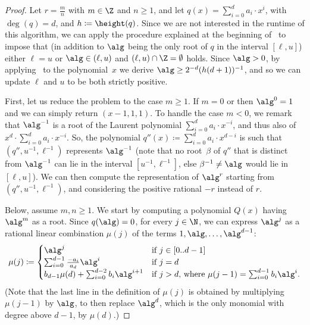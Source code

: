 \begin{proof}
  Let $r = \frac{m}{n}$ with $m \in \Z$ and $n \geq 1$, and let $q(x) =
  \sum_{i=0}^d a_i \cdot x^i$, with $\deg(q) = d$, and $h \coloneqq \height(q)$.
  Since we are not interested in the runtime of this algorithm, we can apply the
  procedure explained at the beginning of~ to
  impose that (in addition to $\alg$ being the only root of $q$ in the interval
  $[\ell,u]$) either $\ell = u$ or $\alg \in (\ell,u)$ and $(\ell,u) \cap \Z =
  \emptyset$ holds. Since $\alg > 0$, by
  applying~ to the polynomial~$x$ we derive $\alg
  \geq 2^{-d}(h(d+1))^{-1}$, and so we can update $\ell$ and $u$ to be both
  strictly positive.
  
  First, let us reduce the problem to the case $m \geq 1$. If $m = 0$ or then
  $\alg^0 = 1$ and we can simply return $(x-1,1,1)$. To handle the case $m < 0$,
  we remark that $\alg^{-1}$ is a root of the Laurent polynomial $\sum_{i = 0}^d
  a_i \cdot x^{-i}$, and thus also of $x^d \cdot \sum_{i=0}^d a_i \cdot x^{-i}$.
  So, the polynomial $q''(x) \coloneqq \sum_{i=0}^d a_i \cdot x^{d-i}$ is such
  that $(q'',u^{-1},\ell^{-1})$ represents $\alg^{-1}$ (note that no
  root~$\beta$ of $q''$ that is distinct from $\alg^{-1}$ can lie in the
  interval $[u^{-1},\ell^{-1}]$, else $\beta^{-1} \neq \alg$ would lie in
  $[\ell,u]$). We can then compute the representation of $\alg^r$ starting from
  $(q'',u^{-1},\ell^{-1})$, and considering the positive rational $-r$ instead
  of $r$.

  Below, assume $m,n \geq 1$. We start by computing a polynomial $Q(x)$ 
  having $\alg^m$ as a root.
  Since $q(\alg)=0$, for every $j \in \N$, we can express $\alg^j$ as a
  rational linear combination $\mu(j)$ of the terms $1,\alg,\dots,\alg^{d-1}$: 
  \[ 
    \mu(j) \coloneqq  
      \begin{cases}
        \alg^j &\text{if $j \in [0..d-1]$}\\
        \sum_{i=0}^{d-1}\frac{-a_i}{a_d} \alg^{i} &\text{if $j = d$}\\
        b_{d-1}\mu(d) + \sum_{i=0}^{d-2}b_i\alg^{i+1} &\text{if $j > d$, where $\mu(j-1) = \sum_{i=0}^{d-1} b_i \alg^i$}.
      \end{cases}
  \]
  (Note that the last line in the definition of $\mu(j)$ is obtained by
  multiplying $\mu(j-1)$ by $\alg$, to then replace $\alg^d$, which is the only
  monomial with degree above $d-1$, by $\mu(d)$.)


\end{proof}

